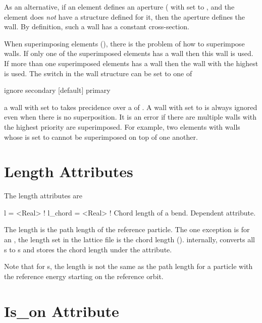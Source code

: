 As an alternative, if an element defines an aperture (
with  set to , and the element does
{\it not} have a  structure defined for it, then the aperture
defines the wall. By definition, such a wall has a constant cross-section.

When superimposing elements (), there is the problem of
how to superimpose walls. If only one of the superimposed elements has
a wall then this wall is used. If more than one superimposed elements
has a wall then the wall with the highest  is used. The
 switch in the wall structure can be set to one of
\begin{example}
  ignore
  secondary  [default]
  primary
\end{example}
a wall with  set to  takes precidence over a
 of . A wall with  set to
 is always ignored even when there is no superposition. It
is an error if there are multiple walls with the highest priority are
superimposed. For example, two elements with walls whose 
is set to  cannot be superimposed on top of one another.

\section{Length Attributes}
\label{s:l}

The length attributes are
\begin{example}
  l       = <Real>  ! 
  l_chord = <Real>  ! Chord length of a bend. Dependent attribute.
\end{example}
The length  is the path length of the reference particle. The
one exception is for an , the length  set in the
lattice file is the chord length (). internally, \bmad
converts all s to s and stores the chord length
under the  attribute.

Note that for s,
the length  is not the same as the path length for a particle
with the reference energy starting on the reference orbit.

\section{Is_on Attribute}
\label{s:is.on}

